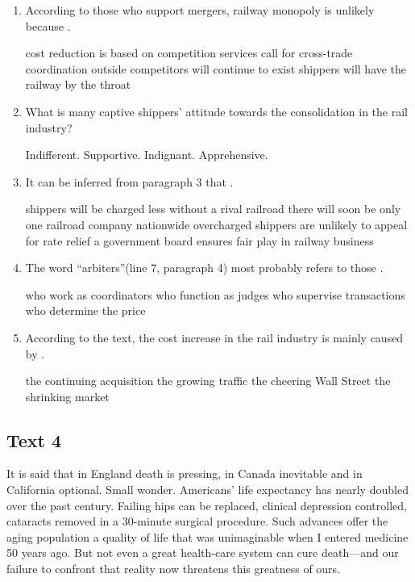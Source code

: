 \begin{enumerate}[resume]
	\item
According to those who support mergers, railway monopoly is unlikely
because \lineread.


\fourchoices
{cost reduction is based on competition}
{services call for cross-trade coordination}
{outside competitors will continue to exist}
{shippers will have the railway by the throat}


\item
What is many captive shippers' attitude towards the consolidation in
the rail industry?


\fourchoices
{Indifferent.}
{Supportive.}
{Indignant.}
{Apprehensive.}


\item
 It can be inferred from paragraph 3 that \lineread.


\fourchoices
{shippers will be charged less without a rival railroad}
{there will soon be only one railroad company nationwide}
{overcharged shippers are unlikely to appeal for rate relief}
{a government board ensures fair play in railway business}

\item
The word ``arbiters''(line 7, paragraph 4) most probably refers to
those \lineread.


\fourchoices
{who work as coordinators}
{who function as judges}
{who supervise transactions}
{who determine the price}


\item
According to the text, the cost increase in the rail industry is
mainly caused by \lineread.


\fourchoices
{the continuing acquisition}
{the growing traffic}
{the cheering Wall Street}
{the shrinking market}


\end{enumerate}


\newpage
\subsection{Text 4}


It is said that in England death is pressing, in Canada inevitable and
in California optional. Small wonder. Americans' life expectancy has
nearly doubled over the past century. Failing hips can be replaced,
clinical depression controlled, cataracts removed in a 30-minute
surgical procedure. Such advances offer the aging population a quality
of life that was unimaginable when I entered medicine 50 years ago. But
not even a great health-care system can cure death---and our failure to
confront that reality now threatens this greatness of ours.

